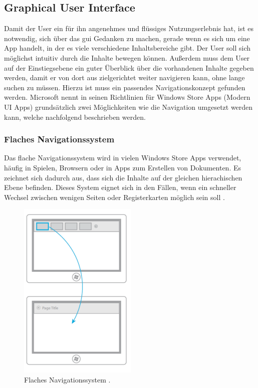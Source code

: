\documentclass[12pt,a4paper,bibtotoc,abstracton]{scrartcl}
\begin{document}
\subsection{Graphical User Interface}
\label{subsec:gui}
Damit der User ein für ihn angenehmes und flüssiges Nutzungserlebnis hat, ist es notwendig, sich über das \ac{gui} Gedanken zu machen, gerade wenn es sich um eine App handelt, in der es viele verschiedene Inhaltsbereiche gibt. Der User soll sich möglichst intuitiv durch die Inhalte bewegen können. Außerdem muss dem User auf der Einstiegsebene ein guter Überblick über die vorhandenen Inhalte gegeben werden, damit er von dort aus zielgerichtet weiter navigieren kann, ohne lange suchen zu müssen. Hierzu ist muss ein passendes Navigationskonzept gefunden werden.  Microsoft nennt in seinen Richtlinien für Windows Store Apps (Modern UI Apps) grundsätzlich zwei Möglichkeiten wie die Navigation umgesetzt werden kann, welche nachfolgend beschrieben werden.

\subsubsection{Flaches Navigationssystem}
\label{subsubsec:flachessystem}
Das flache Navigationssystem wird in vielen Windows Store Apps verwendet, häufig in Spielen, Browsern oder in Apps zum Erstellen von Dokumenten. Es zeichnet sich dadurch aus, dass sich die Inhalte auf der gleichen hierachischen Ebene befinden. Dieses System eignet sich in den Fällen, wenn ein schneller Wechsel zwischen wenigen Seiten oder Registerkarten möglich sein soll \citep{MicrosoftNavidesign2013}.

\begin{figure}[h]	
	\centering
	\includegraphics[scale=1]{Bilder/Abbildungen/ms_navigation_flach.png} 
	\caption{Flaches Navigationssystem \protect\citep{MicrosoftNavidesign2013}.}
	\label{fig:naviflach}
\end{figure}
\end{document}
